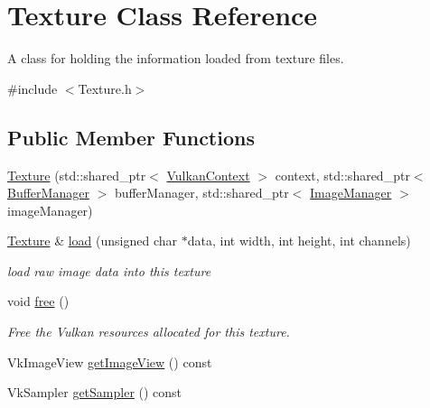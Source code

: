 \hypertarget{class_texture}{}\section{Texture Class Reference}
\label{class_texture}


A class for holding the information loaded from texture files.  




{\ttfamily \#include $<$Texture.\+h$>$}

\subsection*{Public Member Functions}
\begin{DoxyCompactItemize}
\item 
\mbox{\hyperlink{class_texture_a43b83bcb12e9dc66bd799de3a2ebee63}{Texture}} (std\+::shared\+\_\+ptr$<$ \mbox{\hyperlink{class_vulkan_context}{Vulkan\+Context}} $>$ context, std\+::shared\+\_\+ptr$<$ \mbox{\hyperlink{class_buffer_manager}{Buffer\+Manager}} $>$ buffer\+Manager, std\+::shared\+\_\+ptr$<$ \mbox{\hyperlink{class_image_manager}{Image\+Manager}} $>$ image\+Manager)
\item 
\mbox{\hyperlink{class_texture}{Texture}} \& \mbox{\hyperlink{class_texture_a05be73b0042571238a897214d8b0d9a0}{load}} (unsigned char $\ast$data, int width, int height, int channels)
\begin{DoxyCompactList}\small\item\em load raw image data into this texture \end{DoxyCompactList}\item 
\mbox{\label{class_texture_a46d06aec832e5a954f1c8ca957c2c6e5}} 
void \mbox{\hyperlink{class_texture_a46d06aec832e5a954f1c8ca957c2c6e5}{free}} ()
\begin{DoxyCompactList}\small\item\em Free the Vulkan resources allocated for this texture. \end{DoxyCompactList}\item 
Vk\+Image\+View \mbox{\hyperlink{class_texture_ae1304d0849bad6d745794edff547fbed}{get\+Image\+View}} () const
\item 
Vk\+Sampler \mbox{\hyperlink{class_texture_ac84290121b3faf715445b4905140647d}{get\+Sampler}} () const
\end{DoxyCompactItemize}
